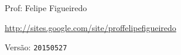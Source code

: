 \documentclass[a4paper]{article}
\begin{document}
\parbox[c]{.825\textwidth}{\raggedright%
{Prof: Felipe Figueiredo\par}
{\url{http://sites.google.com/site/proffelipefigueiredo}\par}
}

Versão: \verb|20150527|



\section{}


\section{}
\end{document}
